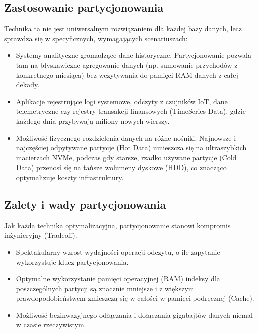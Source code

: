 \documentclass[letterpaper,10pt,polish]{sphinxmanual}
\begin{document}
\subsection{Zastosowanie partycjonowania}
\label{\detokenize{rozdzia_u0142_2/rozdzia_u0142_26/index:zastosowanie-partycjonowania}}
\sphinxAtStartPar
Technika ta nie jest uniwersalnym rozwiązaniem dla każdej bazy danych, lecz sprawdza się w specyficznych, wymagających scenariuszach:
\begin{itemize}
\item {} 
\sphinxAtStartPar
{} Systemy analityczne gromadzące dane historyczne. Partycjonowanie pozwala tam na błyskawiczne agregowanie danych (np. sumowanie przychodów z konkretnego miesiąca) bez wczytywania do pamięci RAM danych z całej dekady.

\item {} 
\sphinxAtStartPar
{} Aplikacje rejestrujące logi systemowe, odczyty z czujników IoT, dane telemetryczne czy rejestry transakcji finansowych (Time\sphinxhyphen{}Series Data), gdzie każdego dnia przybywają miliony nowych wierszy.

\item {} 
\sphinxAtStartPar
{} Możliwość fizycznego rozdzielenia danych na różne nośniki. Najnowsze i najczęściej odpytywane partycje (Hot Data) umieszcza się na ultra\sphinxhyphen{}szybkich macierzach NVMe, podczas gdy starsze, rzadko używane partycje (Cold Data) przenosi się na tańsze wolumeny dyskowe (HDD), co znacząco optymalizuje koszty infrastruktury.

\end{itemize}


\subsection{Zalety i wady partycjonowania}
\label{\detokenize{rozdzia_u0142_2/rozdzia_u0142_26/index:zalety-i-wady-partycjonowania}}
\sphinxAtStartPar
Jak każda technika optymalizacyjna, partycjonowanie stanowi kompromis inżynieryjny (Trade\sphinxhyphen{}off).

\sphinxAtStartPar
{}
\begin{itemize}
\item {} 
\sphinxAtStartPar
Spektakularny wzrost wydajności operacji odczytu, o ile zapytanie wykorzystuje klucz partycjonowania.

\item {} 
\sphinxAtStartPar
Optymalne wykorzystanie pamięci operacyjnej (RAM) \textendash{} indeksy dla poszczególnych partycji są znacznie mniejsze i z większym prawdopodobieństwem zmieszczą się w całości w pamięci podręcznej (Cache).

\item {} 
\sphinxAtStartPar
Możliwość bezinwazyjnego odłączania i dołączania gigabajtów danych niemal w czasie rzeczywistym.

\end{itemize}
\end{document}
